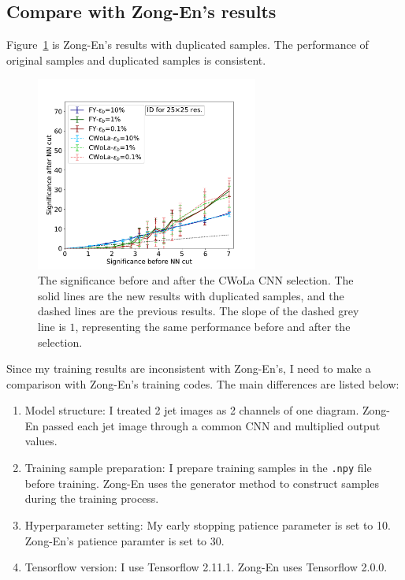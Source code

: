 \documentclass[12pt]{article}
\begin{document}
	\subsection{Compare with Zong-En's results}%
	\label{sub:compare_with_zong_en_s_results}
		Figure~\ref{fig:sensitivity_improvement_bkg_eff_copy_1_ZN_testing} is Zong-En's results with duplicated samples. The performance of original samples and duplicated samples is consistent.
		\begin{figure}[htpb]
			\centering
			\includegraphics[width=0.65\textwidth]{HVmodel_sensitivity_improvement_bkg_eff_copy_1_ZN_testing.pdf}
			\caption{The significance before and after the CWoLa CNN selection. The solid lines are the new results with duplicated samples, and the dashed lines are the previous results. The slope of the dashed grey line is $1$, representing the same performance before and after the selection.}
			\label{fig:sensitivity_improvement_bkg_eff_copy_1_ZN_testing}
		\end{figure}

		Since my training results are inconsistent with Zong-En's, I need to make a comparison with Zong-En's training codes. The main differences are listed below:
		\begin{enumerate}
			\item Model structure: I treated 2 jet images as 2 channels of one diagram. Zong-En passed each jet image through a common CNN and multiplied output values.
			\item Training sample preparation: I prepare training samples in the \verb|.npy| file before training. Zong-En uses the generator method to construct samples during the training process.
			\item Hyperparameter setting: My early stopping patience parameter is set to 10. Zong-En's patience paramter is set to 30.
			\item Tensorflow version: I use Tensorflow 2.11.1. Zong-En uses Tensorflow 2.0.0.
		\end{enumerate}
\end{document}
